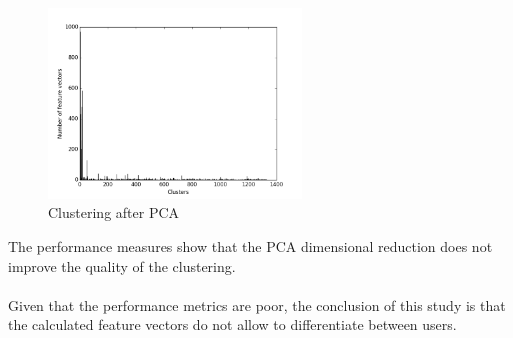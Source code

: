 \documentclass[11pt, oneside]{article}   	%
\begin{document}
\begin{figure}[h!]
  \centering
    \includegraphics[width=0.6\textwidth]{./pythonScripts/pcaClustering.png}
      \caption{Clustering after PCA}
      \label{figure:pcaClustering}
\end{figure}
The performance measures show that the PCA dimensional reduction does not improve the quality of the clustering.\\\\
Given that the performance metrics are poor, the conclusion of this study is that the calculated feature vectors do not allow to differentiate between users.
\newpage
\label{subsection:kMeansStudy}
\end{document}
